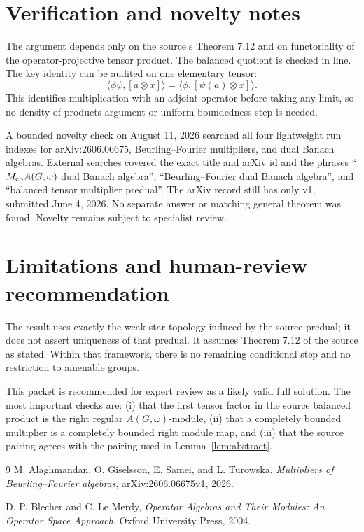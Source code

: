 \documentclass[11pt]{article}
\begin{document}
\section{Verification and novelty notes}

The argument depends only on the source's Theorem 7.12 and on functoriality of
the operator-projective tensor product.  The balanced quotient is checked in
line.  The key identity can be audited on one elementary tensor:
\[
 \langle\phi\psi,[a\otimes x]\rangle
 =\langle\phi,[\psi(a)\otimes x]\rangle.
\]
This identifies multiplication with an adjoint operator before taking any
limit, so no density-of-products argument or uniform-boundedness step is
needed.

A bounded novelty check on August 11, 2026 searched all four lightweight run
indexes for arXiv:2606.06675, Beurling--Fourier multipliers, and dual Banach
algebras.  External searches covered the exact title and arXiv id and the
phrases ``$M_{\rm cb}A(G,\omega)$ dual Banach algebra'', ``Beurling--Fourier
dual Banach algebra'', and ``balanced tensor multiplier predual''.  The arXiv
record still has only v1, submitted June 4, 2026.  No separate answer or
matching general theorem was found.  Novelty remains subject to specialist
review.

\section{Limitations and human-review recommendation}

The result uses exactly the weak-star topology induced by the source predual;
it does not assert uniqueness of that predual.  It assumes Theorem 7.12 of the
source as stated.  Within that framework, there is no remaining conditional
step and no restriction to amenable groups.

This packet is recommended for expert review as a likely valid full solution.
The most important checks are: (i) that the first tensor factor in the source
balanced product is the right regular $A(G,\omega)$-module, (ii) that a
completely bounded multiplier is a completely bounded right module map, and
(iii) that the source pairing agrees with the pairing used in
Lemma~\ref{lem:abstract}.

\begin{thebibliography}{9}
M. Alaghmandan, O. Giselsson, E. Samei, and L. Turowska,
\emph{Multipliers of Beurling--Fourier algebras},
arXiv:2606.06675v1, 2026.

D. P. Blecher and C. Le Merdy,
\emph{Operator Algebras and Their Modules: An Operator Space Approach},
Oxford University Press, 2004.
\end{thebibliography}
\end{document}
